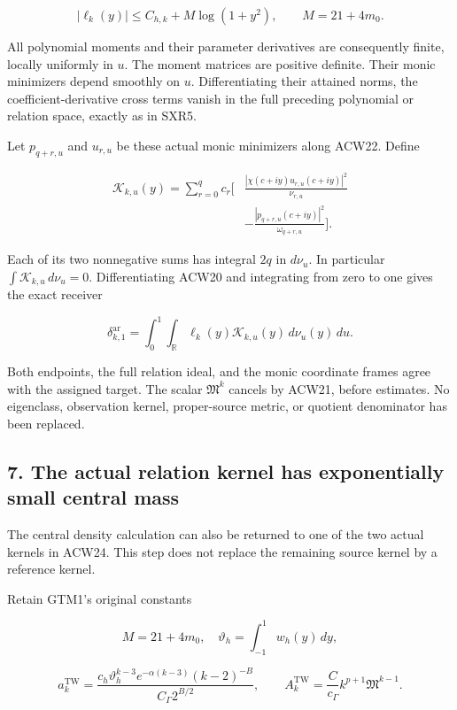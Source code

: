 \documentclass[11pt,a4paper]{article}
\begin{document}
\[
|\ell_k(y)|\le C_{h,k}+M\log(1+y^2),
\qquad M=21+4m_0.
\]

All polynomial moments and their parameter derivatives are consequently finite, locally uniformly in \(u\). The moment matrices are positive definite. Their monic minimizers depend smoothly on \(u\). Differentiating their attained norms, the coefficient-derivative cross terms vanish in the full preceding polynomial or relation space, exactly as in SXR5.

Let \(p_{q+r,u}\) and \(u_{r,u}\) be these actual monic minimizers along ACW22. Define

\[
\begin{aligned}
\mathcal K_{k,u}(y)=\sum_{r=0}^q c_r\bigg[
&\frac{|\chi(c+iy)u_{r,u}(c+iy)|^2}{\nu_{r,u}}\\
&-\frac{|p_{q+r,u}(c+iy)|^2}{\omega_{q+r,u}}
\bigg].
\end{aligned}
\tag{ACW23}
\]

Each of its two nonnegative sums has integral \(2q\) in \(d\nu_u\). In particular \(\int\mathcal K_{k,u}\,d\nu_u=0\). Differentiating ACW20 and integrating from zero to one gives the exact receiver

\[
\boxed{
\delta_{k,1}^{\mathrm{ar}}
=\int_0^1\int_{\mathbb R}
\ell_k(y)\mathcal K_{k,u}(y)\,d\nu_u(y)\,du.}
\tag{ACW24}
\]

Both endpoints, the full relation ideal, and the monic coordinate frames agree with the assigned target. The scalar \(\mathfrak M^k\) cancels by ACW21, before estimates. No eigenclass, observation kernel, proper-source metric, or quotient denominator has been replaced.

\subsection{7. The actual relation kernel has exponentially small central mass}\label{acw:the-actual-relation-kernel-has-exponentially-small-central-mass}

The central density calculation can also be returned to one of the two actual kernels in ACW24. This step does not replace the remaining source kernel by a reference kernel.

Retain GTM1's original constants

\[
M=21+4m_0,\quad
\vartheta_h=\int_{-1}^1 w_h(y)\,dy,
\]

\[
a_k^{\mathrm{TW}}=
\frac{c_h\vartheta_h^{k-3}e^{-\alpha(k-3)}(k-2)^{-B}}
 {C_\Gamma2^{B/2}},\qquad
A_k^{\mathrm{TW}}=\frac{C}{c_\Gamma}k^{p+1}\mathfrak M^{k-1}.
\]
\end{document}
